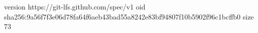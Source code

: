 version https://git-lfs.github.com/spec/v1
oid sha256:9a56f7f3e06d78fa64f6aeb43bad55a8242e83bf94807f10b5902f96c1bcffb0
size 73
